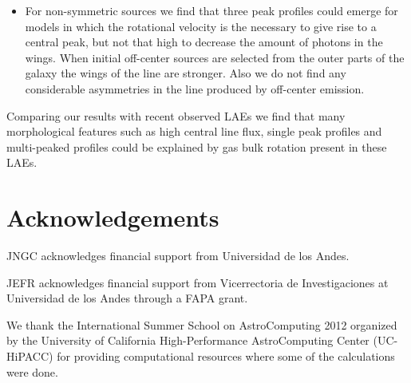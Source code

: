 \documentclass{emulateapj}
\begin{document}
\begin{itemize}
\item For non-symmetric sources we find that three peak profiles
could emerge for models in which the rotational velocity is the necessary 
to give rise to a central peak, but not that high to decrease the
amount of photons in the wings. When initial off-center sources are 
selected from the outer parts of the galaxy the wings of the line are stronger.
Also we do not find any considerable asymmetries in the line produced by off-center 
emission.
\end{itemize}

Comparing our results with recent observed LAEs we find that many 
morphological features such as high central line flux, single peak
profiles and multi-peaked profiles could be explained by gas bulk 
rotation present in these LAEs.


\section*{Acknowledgements}

JNGC acknowledges financial support from Universidad de los
Andes. 

JEFR acknowledges financial support from Vicerrectoria de
Investigaciones at Universidad de los Andes through a FAPA grant.

We thank the International Summer School on AstroComputing
2012 organized by the University of California High-Performance
AstroComputing Center (UC-HiPACC) for providing computational
resources where some of the calculations were done. 





 
\end{document}
